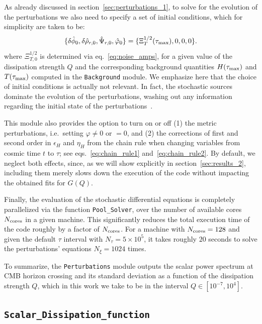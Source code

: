 \documentclass[a4paper,11pt]{article}
\begin{document}
As already discussed in section~\ref{sec:perturbations_1}, to solve for the evolution of the perturbations we also need to specify a set of initial conditions, which for simplicity are taken to be:
\begin{equation}
  \{\delta\hat{\phi}_0,\delta\hat{\rho}_{r,0},\hat{\Psi}_{r,0},\hat{\varphi}_0\}=\{\Xi_{T}^{1/2}(\tau_{\rm{max}}),0,0,0 \}.  
\end{equation}
where $\Xi_{T,0}^{1/2}$ is determined via eq.~\eqref{eq:noise_amps}, for a given value of the dissipation strength $Q$ and the corresponding background quantities $H(\tau_{\rm{max}})$ and $T(\tau_{\rm{max}})$ computed in the \texttt{Background} module. We emphasize here that the choice of initial conditions is actually not relevant. In fact, the stochastic sources dominate the evolution of the perturbations, washing out any information regarding the initial state of the perturbations~\cite{Bastero-Gil:2011rva,Ballesteros:2022hjk}.

This module also provides the option to turn on or off (1) the metric perturbations, i.e.\ setting $\varphi\neq0$ or $=0$, and (2) the corrections of first and second order in $\epsilon_H$ and $\eta_H$ from the chain rule when changing variables from cosmic time $t$ to $\tau$; see eqs.~\eqref{eq:chain_rule1} and~\eqref{eq:chain_rule2}. By default, we neglect both effects, since, as we will show explicitly in section~\ref{sec:results_2}, including them merely slows down the execution of the code without impacting the obtained fits for $G(Q)$.

Finally, the evaluation of the stochastic differential equations is completely parallelized via the function \texttt{Pool\_Solver}, over the number of available cores $N_{\rm cores}$ in a given machine. This significantly reduces the total execution time of the code roughly by a factor of $N_{\rm cores}$. For a machine with $N_{\rm{cores}}=128$ and given the default $\tau$ interval with $N_{\tau}=5\times10^{5}$, it takes roughly $20$ seconds to solve the perturbations' equations $N_\xi=1024$ times.

To summarize, the \texttt{Perturbations} module outputs the scalar power spectrum at CMB horizon crossing and its standard deviation as a function of the dissipation strength $Q$, which in this work we take to be in the interval $Q\in [10^{-7},10^{4}]$.

\subsection{\texttt{Scalar\_Dissipation\_function}}
\end{document}
